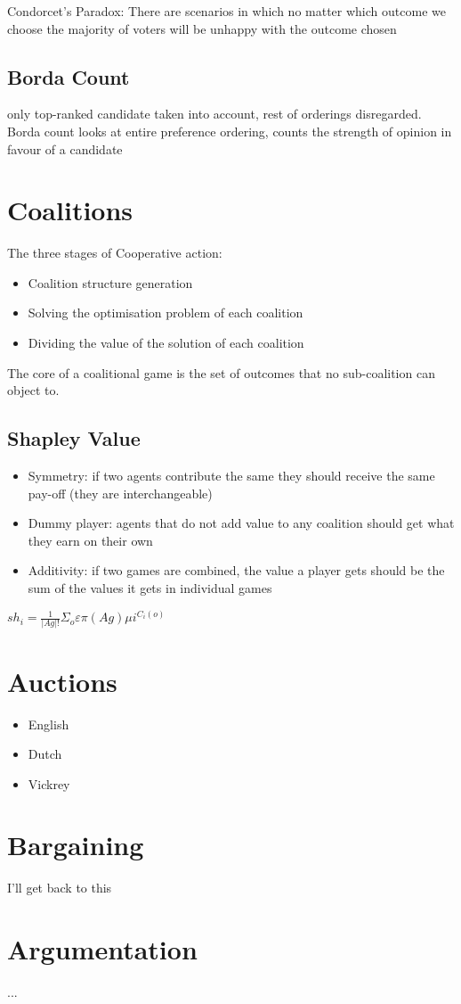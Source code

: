 \documentclass{article}
\begin{document}
Condorcet’s Paradox:
There are scenarios in which no matter which outcome we choose the majority of voters will be unhappy with the outcome chosen

\subsection{Borda Count}
only top-ranked candidate taken into account, rest of orderings disregarded.
Borda count looks at entire preference ordering, counts the strength of opinion in favour of a candidate

\section{Coalitions}
The three stages of Cooperative action:
\begin{itemize}
    \item Coalition structure generation
    \item Solving the optimisation problem of each coalition
    \item Dividing the value of the solution of each coalition
\end{itemize}
The core of a coalitional game is the set of outcomes that no sub-coalition can object to.

\subsection{Shapley Value}
\begin{itemize}
\item Symmetry: if two agents contribute the same they should receive the same pay-off (they are interchangeable)
\item Dummy player: agents that do not add value to any coalition should get what they earn on their own
\item Additivity: if two games are combined, the value a player gets should be the sum of the values it gets in individual games
\end{itemize}
$sh_i = \frac{1}{|Ag|!}\Sigma_o  \varepsilon \pi(Ag) \mu i^{C_i(o)}$

\section{Auctions}
\begin{itemize}
\item English
\item Dutch
\item Vickrey
\end{itemize}

\section{Bargaining}
I'll get back to this

\section{Argumentation}
...
\end{document}
